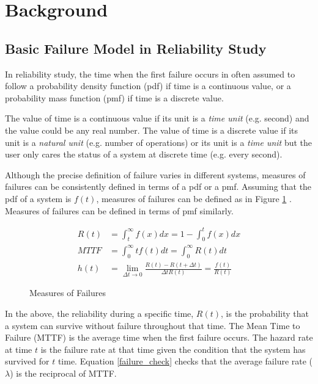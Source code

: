 \section{Background}


\subsection{Basic Failure Model in Reliability Study}

In reliability study, the time when the first failure occurs in often assumed 
to follow a probability density function (pdf) if time is a continuous value, or 
a probability mass function (pmf) if time is a discrete value. \citep{MusaBook} 
 
The value of time is a continuous value if its unit is a {\it time unit} (e.g. 
second) and the value could be any real number.  The value of time is 
a discrete value if its unit is a {\it natural unit} (e.g. number of 
operations) or its unit is a {\it time unit} but the user only cares the 
status of a system at discrete time (e.g. every second).

Although the precise definition of failure varies in different systems, 
measures of failures can be consistently defined in terms of a pdf or a
pmf.  Assuming that the pdf of a system is $f(t)$, measures of failures can be 
defined as in Figure \ref{eq:measure_of_failures} 
\citep{MusaBook}.  Measures of failures can be defined in terms of pmf 
similarly.

\begin{figure}
\begin{subequations} 
\begin{align}
    R(t) & = \int_{t}^{\infty} f(x) dx = 1- \int_{0}^{t} f(x) dx  \label{subeq1}\\
   MTTF & = \int_{0}^{\infty} tf(t)dt  = \int_{0}^{\infty} R(t)dt 
\label{mttf}\\
   h(t) & = \lim_{\Delta t\rightarrow 0} \frac{R(t)-R(t+\Delta t)}{\Delta t 
R(t)}  = \frac{f(t)}{R(t)}
\end{align}
\end{subequations}
\caption{Measures of Failures}
\label{eq:measure_of_failures}
\end{figure}

In the above, the reliability during a specific time, $R(t)$, is the 
probability that a system can survive without failure throughout that time.  
The Mean Time to Failure (MTTF) is the average time when the first failure 
occurs.  The hazard rate at time $t$ is the failure rate at that time given 
the condition that the system has survived for $t$ time.  Equation 
\ref{failure_check} checks that the average failure rate ($\lambda$) is the 
reciprocal of MTTF.

